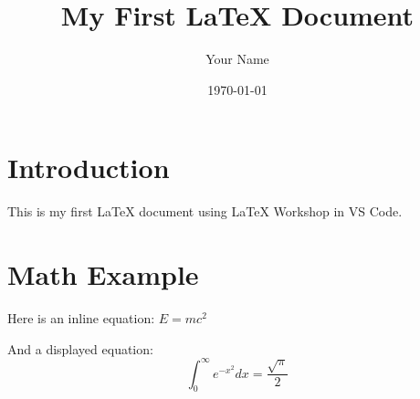 \documentclass{article}
\title{My First LaTeX Document}
\author{Your Name}
\date{\today}
\begin{document}
\maketitle

\section{Introduction}

This is my first LaTeX document using \LaTeX{} Workshop in VS Code.

\section{Math Example}

Here is an inline equation: \( E = mc^2 \)

And a displayed equation:
\[
\int_{0}^{\infty} e^{-x^2} dx = \frac{\sqrt{\pi}}{2}
\]
\end{document}
